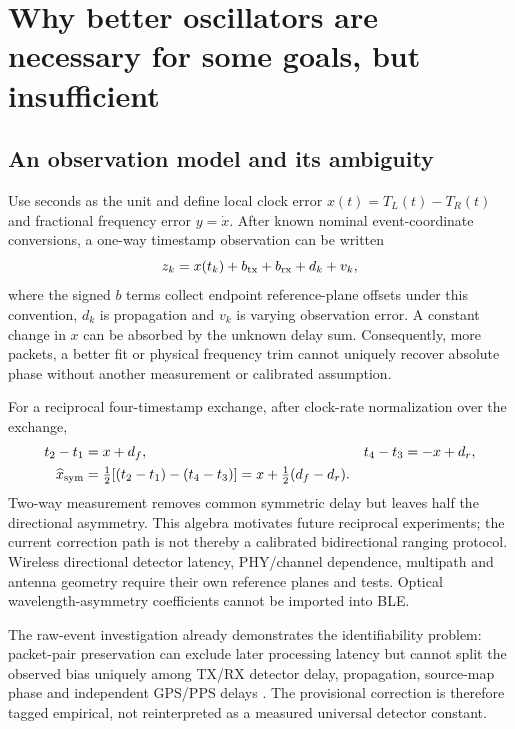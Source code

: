 \documentclass[11pt,letterpaper]{article}
\begin{document}
\section{Why better oscillators are necessary for some goals, but insufficient}
\subsection{An observation model and its ambiguity}
Use seconds as the unit and define local clock error $x(t)=T_L(t)-T_R(t)$ and fractional frequency error $y=\dot x$. After known nominal event-coordinate conversions, a one-way timestamp observation can be written
\begin{equation}
z_k=x(t_k)+b_{\rm tx}+b_{\rm rx}+d_k+v_k,
\label{eq:oneway}
\end{equation}
where the signed $b$ terms collect endpoint reference-plane offsets under this convention, $d_k$ is propagation and $v_k$ is varying observation error. A constant change in $x$ can be absorbed by the unknown delay sum. Consequently, more packets, a better fit or physical frequency trim cannot uniquely recover absolute phase without another measurement or calibrated assumption.

For a reciprocal four-timestamp exchange, after clock-rate normalization over the exchange,
\begin{align}
t_2-t_1&=x+d_f, & t_4-t_3&=-x+d_r,\\
\widehat x_{\rm sym}&=\tfrac12[(t_2-t_1)-(t_4-t_3)]
=x+\tfrac12(d_f-d_r).
\label{eq:twoway}
\end{align}
Two-way measurement removes common symmetric delay but leaves half the directional asymmetry. This algebra motivates future reciprocal experiments; the current correction path is not thereby a calibrated bidirectional ranging protocol. Wireless directional detector latency, PHY/channel dependence, multipath and antenna geometry require their own reference planes and tests. Optical wavelength-asymmetry coefficients cannot be imported into BLE.

The raw-event investigation already demonstrates the identifiability problem: packet-pair preservation can exclude later processing latency but cannot split the observed bias uniquely among TX/RX detector delay, propagation, source-map phase and independent GPS/PPS delays \cite{rawaudit}. The provisional correction is therefore tagged empirical, not reinterpreted as a measured universal detector constant.
\end{document}
